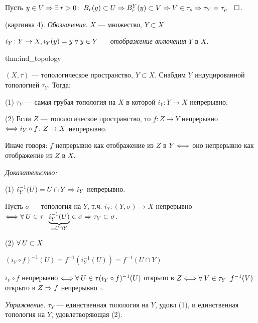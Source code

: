 \documentclass[../../main.tex]{subfiles}
\begin{document}
Пусть $y \in V \Rightarrow \exists\: r > 0 \colon \; B_r(y) \subset U \Rightarrow B^Y_r(y) \subset V \Rightarrow V \in \tau_{\rho} \Rightarrow \tau_Y = \tau_{\rho} \quad \square$.

(картинка 4). \textit{Обозначение}. $X$ — множество, $Y \subset X$

$i_Y \colon Y \to X, i_Y(y) = y \; \forall\: y \in Y$ — \textit{отображение включения} $Y$ в $X$.

\begin{theo}{thm:ind_topology}

$(X, \tau)$ — топологическое пространство, $Y \subset X$. Снабдим $Y$ индуцированной топологией $\tau_Y$. Тогда:

(1) $\tau_Y$ — самая грубая\footnotemark{} топология на $X$ в которой $i_Y \colon Y \to X$ непрерывно,

(2) Если $Z$ — топологическое пространство, то $f \colon Z \to Y$ непрерывно $\Longleftrightarrow i_Y \circ f \colon Z \to X$ непрерывно.

Иначе говоря: $f$ непрерывно как отображение из $Z$ в $Y \Longleftrightarrow$ оно непрерывно как отображение из $Z$ в $X$.
\end{theo}

\textit{Доказательство:} 

(1) $i^{-1}_Y(U) = U \cap Y \Rightarrow i_Y$ непрерывно.

Пусть $\sigma$ — топология на $Y$, т.ч. $i_Y \colon (Y, \sigma) \to X$ непрерывно $\Longleftrightarrow \forall\: U \in \tau \;\; \underbrace{i^{-1}_Y(U)}_{= U \cap Y} \in \sigma \Rightarrow \tau_Y \subset \sigma$.

(2) $\forall\: U \subset X$

$(i_Y\circ f)^{-1}(U) = f^{-1}\left( i^{-1}_Y(U) \right) = f^{-1}(U\cap Y)$

$i_Y\circ f$  непрерывно $\Longleftrightarrow \forall\: U \in \tau (i_Y\circ f)^{-1}(U)$ открыто в $Z \Longleftrightarrow \forall\: V \in \tau_Y \;\; f^{-1}(V)$ открыто в $Z \Rightarrow f$ непрерывно $\square$.

\textit{Упражнение.} $\tau_Y$ — единственная топология на $Y$, удовл (1), и единственная топология на $Y$, удовлетворяющая (2).
\end{document}
